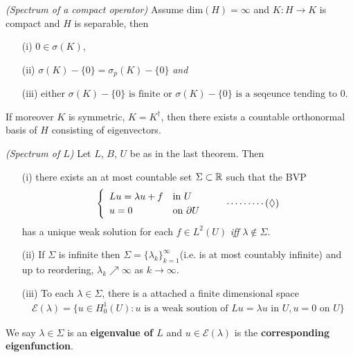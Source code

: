 \documentclass[10pt,a4paper]{report}
\begin{document}
\thm \emph{(Spectrum of a compact operator)} Assume $\text{dim}(H) = \infty$ and $K : H\rightarrow K$ is compact and $H$ is separable, then
\begin{itemize}
\item[(i)] $0 \in \sigma (K)$,
\item[(ii)] $\sigma(K) - \{0\} = \sigma_p(K) - \{0\}$ \emph{and}
\item[(iii)] either $\sigma(K) - \{0\} \text{ is finite}$ or $\sigma(K) - \{0\} \text{ is a seqeunce tending to 0}$.
\end{itemize}
If moreover $K$ is symmetric, $K= K^{\dagger}$, then there exists a countable orthonormal basis of $H$ consisting of eigenvectors.
\s

\thm \emph{(Spectrum of $L$)} Let $L$, $B$, $U$ be as in the last theorem. Then
\begin{itemize}
\item[(i)] there exists an at most countable set $\Sigma \subset \mathbb{R}$ such that the BVP
\begin{align*}
\begin{cases}
\begin{array}{ll}
Lu = \lambda u + f & \text{in } U \\
u = 0 & \text{on } \partial U
\end{array}
\end{cases} \quad \cdots \cdots \cdots (\lozenge)
\end{align*}
has a unique weak solution for each $f\in L^2(U)$ \emph{iff} $\lambda \not\in \Sigma$.
\item[(ii)] If $\Sigma$ is infinite then $\Sigma = \{\lambda_k \}_{k=1}^{\infty}$(i.e. is at most countably infinite) and up to reordering, $\lambda_k \nearrow \infty$ as $k\rightarrow \infty$.
\item[(iii)] To each $\lambda \in \Sigma$, there is a attached a finite dimensional space
\begin{align*}
\mathscr{E}(\lambda) = \{ u \in H_0^1(U) : u \text{ is a weak soution of } Lu=\lambda u \text{ in } U, u=0 \text{ on } U \}
\end{align*}
\end{itemize}
We say $\lambda \in \Sigma$ is an \textbf{eigenvalue of $L$} and $u\in \mathscr{E}(\lambda)$ is the \textbf{corresponding eigenfunction}.
\s
\end{document}
